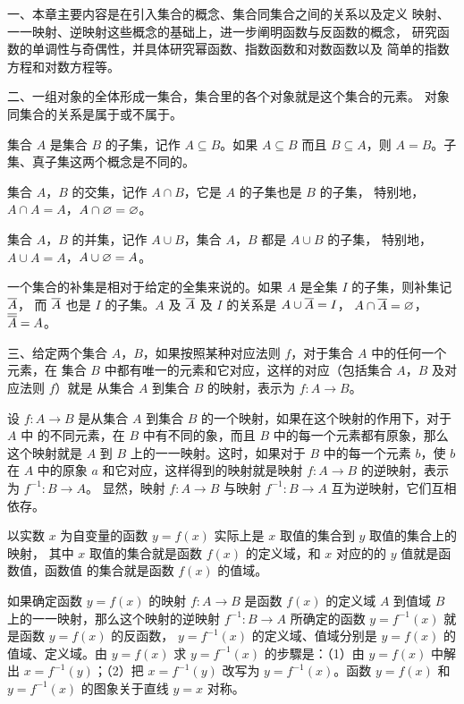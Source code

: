 \xiaojie

一、本章主要内容是在引入集合的概念、集合同集合之间的关系以及定义
映射、一一映射、逆映射这些概念的基础上，进一步阐明函数与反函数的概念，
研究函数的单调性与奇偶性，并具体研究幂函数、指数函数和对数函数以及
简单的指数方程和对数方程等。

二、一组对象的全体形成一集合，集合里的各个对象就是这个集合的元素。
对象同集合的关系是属于或不属于。

集合 $A$ 是集合 $B$ 的子集，记作 $A \subseteq B$。如果 $A \subseteq B$
而且 $B \subseteq A$，则 $A = B$。子集、真子集这两个概念是不同的。

集合 $A$，$B$ 的交集，记作 $A \cap B$，它是 $A$ 的子集也是 $B$ 的子集，
特别地，$A \cap A = A$，$A \cap \varnothing = \varnothing$。

集合 $A$，$B$ 的并集，记作 $A \cup B$，集合 $A$，$B$ 都是 $A \cup B$ 的子集，
特别地，$A \cup A = A$，$A \cup \varnothing = A$。

一个集合的补集是相对于给定的全集来说的。如果 $A$ 是全集 $I$ 的子集，则补集记 $\overline{A}$，
而 $\overline{A}$ 也是 $I$ 的子集。$A$ 及 $\overline{A}$ 及 $I$ 的关系是 $A \cup \overline{A} = I$，
$A \cap \overline{A} = \varnothing$，$\overline{\overline{A}} = A$。

三、给定两个集合 $A$，$B$，如果按照某种对应法则 $f$，对于集合 $A$ 中的任何一个元素，在
集合 $B$ 中都有唯一的元素和它对应，这样的对应（包括集合 $A$，$B$ 及对应法则 $f$）就是
从集合 $A$ 到集合 $B$ 的映射，表示为 $f: A \to B$。

设 $f: A \to B$ 是从集合 $A$ 到集合 $B$ 的一个映射，如果在这个映射的作用下，对于 $A$ 中
的不同元素，在 $B$ 中有不同的象，而且 $B$ 中的每一个元素都有原象，那么这个映射就是 $A$
到 $B$ 上的一一映射。这时，如果对于 $B$ 中的每一个元素 $b$，使 $b$ 在 $A$ 中的原象 $a$
和它对应，这样得到的映射就是映射 $f: A \to B$ 的逆映射，表示为 $f^{-1}: B \to A$。
显然，映射 $f: A \to B$ 与映射 $f^{-1}: B \to A$ 互为逆映射，它们互相依存。

以实数 $x$ 为自变量的函数 $y = f(x)$ 实际上是 $x$ 取值的集合到 $y$ 取值的集合上的映射，
其中 $x$ 取值的集合就是函数 $f(x)$ 的定义域，和 $x$ 对应的的 $y$ 值就是函数值，函数值
的集合就是函数 $f(x)$ 的值域。

如果确定函数 $y = f(x)$ 的映射 $f: A \to B$ 是函数 $f(x)$ 的定义域 $A$ 到值域 $B$
上的一一映射，那么这个映射的逆映射 $f^{-1}: B \to A$ 所确定的函数 $y = f^{-1}(x)$
就是函数 $y = f(x)$ 的反函数， $y = f^{-1}(x)$ 的定义域、值域分别是 $y = f(x)$ 的
值域、定义域。由 $y = f(x)$ 求 $y = f^{-1}(x)$ 的步驟是：（1）由 $y = f(x)$ 中解出
$x = f^{-1}(y)$；（2）把 $x = f^{-1}(y)$ 改写为 $y = f^{-1}(x)$。函数 $y = f(x)$
和 $y = f^{-1}(x)$ 的图象关于直线 $y = x$ 对称。

